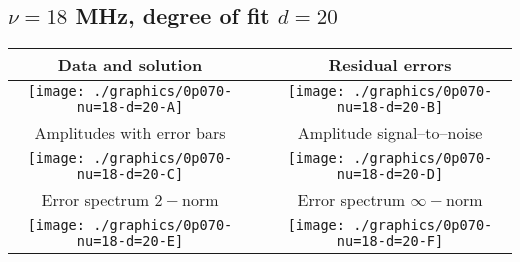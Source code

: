 

% 

\clearpage{}
\break{}

\subsection{$\nu = 18$ MHz, degree of fit $d = 20$}

\begin{table}[h]
    \begin{center}
        \begin{tabular}{ccc}
            Data and solution & \quad & Residual errors \\\hline
            \texttt{[image: ./graphics/0p070-nu=18-d=20-A]} &&
            \texttt{[image: ./graphics/0p070-nu=18-d=20-B]} \\[15pt]
            Amplitudes with error bars && Amplitude signal--to--noise \\\hline
            \texttt{[image: ./graphics/0p070-nu=18-d=20-C]} &&
            \texttt{[image: ./graphics/0p070-nu=18-d=20-D]} \\[15pt]
            Error spectrum $2-$norm && Error spectrum $\infty-$norm \\\hline
            \texttt{[image: ./graphics/0p070-nu=18-d=20-E]} &&
            \texttt{[image: ./graphics/0p070-nu=18-d=20-F]} \\[15pt]
        \end{tabular}
    \end{center}
\label{fig:elev=70, nu=18}
\end{table}



\endinput
